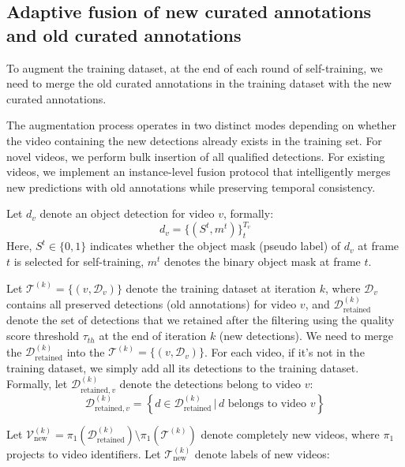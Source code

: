 \subsection{Adaptive fusion of new curated annotations and old curated annotations}

To augment the training dataset, at the end of each round of self-training, we need to merge the old curated annotations in the training dataset with the new curated annotations.

The augmentation process operates in two distinct modes depending on whether the video containing the new detections already exists in the training set. For novel videos, we perform bulk insertion of all qualified detections. For existing videos, we implement an instance-level fusion protocol that intelligently merges new predictions with old annotations while preserving temporal consistency.

Let $d_v$ denote an object detection for video $v$, formally:
\begin{equation}
    d_v = \{(S^t, m^t)\}_t^{T_v} 
\end{equation}
Here, $S^t \in \{0, 1\}$ indicates whether the object mask (pseudo label) of $d_v$ at frame $t$ is selected for self-training, $m^t$ denotes the binary object mask at frame $t$.


Let $\mathcal{T}^{(k)} = \{(v, \mathcal{D}_v)\}$ denote the training dataset at iteration $k$, where $\mathcal{D}_v$ contains all preserved detections (old annotations) for video $v$, and $\mathcal{D}_{\text{retained}}^{(k)}$ denote the set of detections that we retained after the filtering using the quality score threshold $\tau_{th}$ at the end of iteration $k$ (new detections). We need to merge the $\mathcal{D}_{\text{retained}}^{(k)}$ into the $\mathcal{T}^{(k)} = \{(v, \mathcal{D}_v)\}$. For each video, if it's not in the training dataset, we simply add all its detections to the training dataset. Formally, let $\mathcal{D}_{\text{retained},v}^{(k)}$ denote the detections belong to video $v$:
\begin{equation}
    \mathcal{D}_{\text{retained},v}^{(k)} = \left\{ d \in \mathcal{D}_{\text{retained}}^{(k)} \,\big|\, d \text{ belongs to video } v \right\}
\end{equation}

Let $\mathcal{V}_{\text{new}}^{(k)} = \pi_1(\mathcal{D}_{\text{retained}}^{(k)}) \setminus \pi_1(\mathcal{T}^{(k)})$ denote completely new videos, where $\pi_1$ projects to video identifiers. Let $\mathcal{T}_{\text{new}}^{(k)}$ denote labels of new videos:

